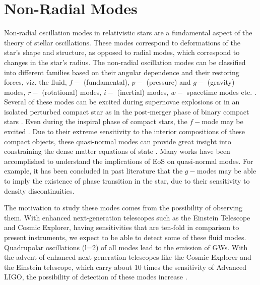 \documentclass[a4paper,12pt,onehalfspacing]{report}
\begin{document}
\section{Non-Radial Modes} \label{sec: non rad modes}

Non-radial oscillation modes in relativistic stars are a fundamental aspect of the theory of stellar oscillations. These modes correspond to deformations of the star's shape and structure, as opposed to radial modes, which correspond to changes in the star's radius. The non-radial oscillation modes can be classified into different families based on their angular dependence and their restoring forces, viz. the fluid, $f-$ (fundamental), $p-$ (pressure) and $g-$ (gravity) modes, $r-$ (rotational) modes, $i-$ (inertial) modes, $w-$ spacetime modes etc. \cite{kokkotasQuasiNormalModesStars1999,cowlingNonradialOscillationsPolytropic1941}. Several of these modes
can be excited during supernovae explosions or in an isolated perturbed compact star as in the post-merger phase of binary compact stars \cite{kokkotasInverseProblemPulsating2001,stergioulasGravitationalWavesNonaxisymmetric2011,PhysRevD.101.084039}. Even during the inspiral phase of compact stars, the $f-$mode may be excited \cite{chirentiGravitationalWavesFmodes2017,PhysRevResearch.3.033129}. Due to their extreme sensitivity to the interior compositions of these compact objects, these quasi-normal modes can provide great insight into constraining the dense matter equations of state \cite{sathyaprakashPhysicsAstrophysicsCosmology2009}. Many works \cite{anderssonGravitationalWavesPulsating1996,anderssonGravitationalWaveAsteroseismology1998,kokkotasInverseProblemPulsating2001} have been accomplished to understand the implications of EoS on quasi-normal modes. For example, it has been concluded in past literature \cite{sotaniDensityDiscontinuityNeutron2001,Sotani,vasquezfloresDiscriminatingHadronicQuark2014} that the $g-$modes may be able to imply the existence of phase transition in the star, due to their sensitivity to density discontinuities. 

The motivation to study these modes comes from the possibility of observing them. With enhanced next-generation telescopes such as the Einstein Telescope and Cosmic Explorer, having sensitivities that are ten-fold in comparison to present instruments, we expect to be able to detect some of these fluid modes. Quadrupolar oscillations (l=2) of all modes lead to the emission of GWs. With the advent of enhanced
next-generation telescopes like the Cosmic Explorer and the Einstein telescope, which carry about 10 times the sensitivity of Advanced LIGO, the possibility of detection of these modes increase \cite{kokkotasInverseProblemPulsating2001,Zhao_universal_f_g}.
\end{document}
